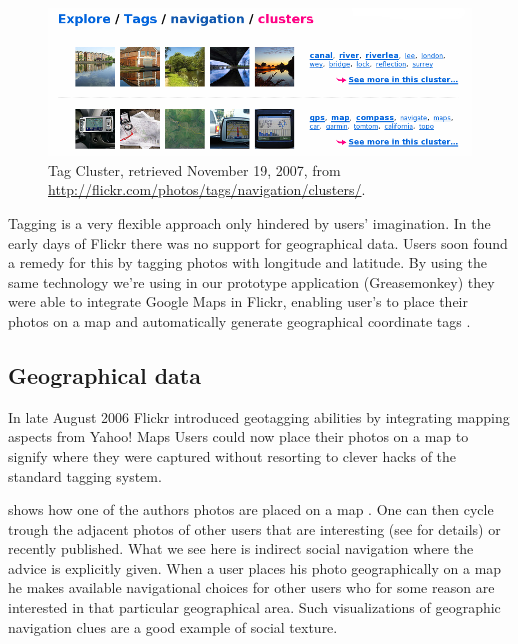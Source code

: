 \begin{figure}
  \begin{whole}
    \includegraphics[width=\wholewidth]{scrsh_flickr_tagcluster}
    \caption[Flickr Tag Cluster]{%
       Tag Cluster,
       retrieved November 19, 2007, from
       \url{http://flickr.com/photos/tags/navigation/clusters/}.}
    \label{figure:scrsh.flickr.tagcluster}
  \end{whole}
\end{figure}

Tagging is a very flexible approach only hindered by users' imagination. In
the early days of Flickr there was no support for geographical data. Users
soon found a remedy for this by tagging photos with longitude and latitude.
By using the same technology we're using in our prototype application
(Greasemonkey) they were able to integrate Google Maps%
 in Flickr, enabling user's to place their photos on a map and automatically
generate geographical coordinate tags%
.

\subsection{Geographical data}

In late August 2006 Flickr introduced geotagging abilities
\citep{butterfield06a} by integrating mapping aspects from Yahoo! Maps%
Users could now place their photos on a
map to signify where they were captured without resorting to clever hacks of
the standard tagging system.

 shows how one of the authors photos are
placed on a map .
One can then cycle trough the adjacent photos of other users
that are interesting (see 
for details) or recently published.
What we see here is indirect social navigation where the advice is explicitly
given. When a user places his photo geographically on a map he makes available
navigational choices for other users who for some reason are interested in
that particular geographical area. Such visualizations of geographic
navigation clues are a good example of social texture.

